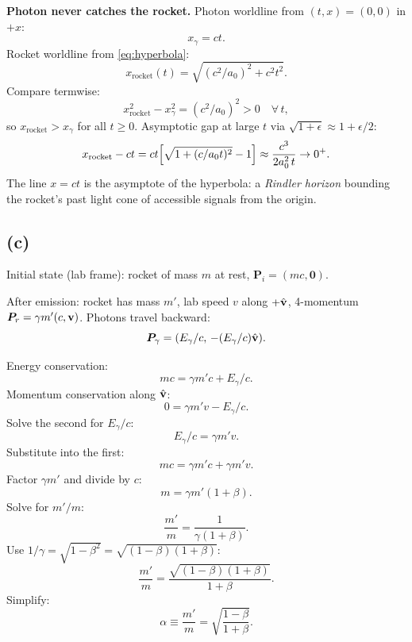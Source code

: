 \documentclass[11pt]{article}
\begin{document}
\textbf{Photon never catches the rocket.} Photon worldline from $(t,x)=(0,0)$ in $+x$:
\[ x_\gamma = ct. \]
Rocket worldline from \eqref{eq:hyperbola}:
\[ x_\text{rocket}(t) = \sqrt{(c^2/a_0)^2 + c^2 t^2}. \]
Compare termwise:
\[ x_\text{rocket}^2 - x_\gamma^2 = (c^2/a_0)^2 > 0\quad\forall\,t, \]
so $x_\text{rocket}>x_\gamma$ for all $t\ge 0$. Asymptotic gap at large $t$ via $\sqrt{1+\epsilon}\approx 1+\epsilon/2$:
\[ x_\text{rocket} - ct = ct\Bigl[\sqrt{1+(c/a_0 t)^2}-1\Bigr] \approx \frac{c^3}{2 a_0^2\, t}\to 0^+. \]
The line $x=ct$ is the asymptote of the hyperbola: a \emph{Rindler horizon} bounding the rocket's past light cone of accessible signals from the origin.

\begin{center}
\end{center}

\subsection*{(c)}

Initial state (lab frame): rocket of mass $m$ at rest, $\bm P_i = (mc,\bm 0)$.

After emission: rocket has mass $m'$, lab speed $v$ along $+\hat{\vb v}$, 4-momentum $\bm P_r=\gamma m'(c,\vb v)$. Photons travel backward:
\[ \bm P_\gamma = (E_\gamma/c,\,-(E_\gamma/c)\hat{\vb v}). \]

Energy conservation:
\[ mc = \gamma m'c + E_\gamma/c. \]
Momentum conservation along $\hat{\vb v}$:
\[ 0 = \gamma m' v - E_\gamma/c. \]
Solve the second for $E_\gamma/c$:
\[ E_\gamma/c = \gamma m' v. \]
Substitute into the first:
\[ mc = \gamma m'c + \gamma m' v. \]
Factor $\gamma m'$ and divide by $c$:
\[ m = \gamma m'(1+\beta). \]
Solve for $m'/m$:
\[ \frac{m'}{m} = \frac{1}{\gamma(1+\beta)}. \]
Use $1/\gamma = \sqrt{1-\beta^2} = \sqrt{(1-\beta)(1+\beta)}$:
\[ \frac{m'}{m} = \frac{\sqrt{(1-\beta)(1+\beta)}}{1+\beta}. \]
Simplify:
\begin{equation}
\boxed{\;\alpha \equiv \frac{m'}{m} = \sqrt{\frac{1-\beta}{1+\beta}}.\;}
\label{eq:alpha}
\end{equation}
\end{document}
